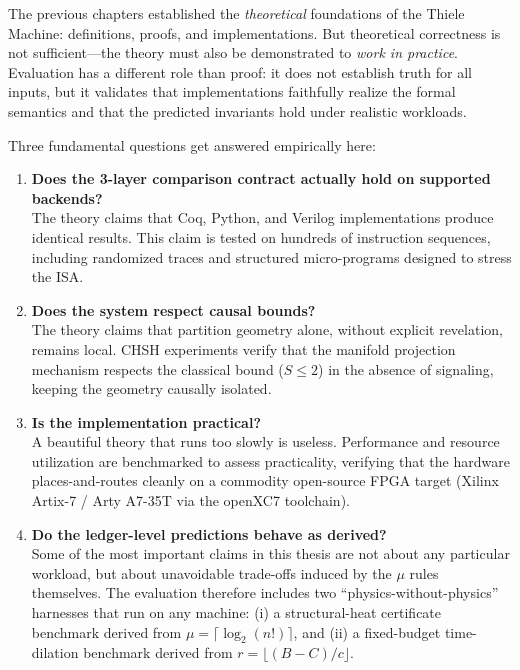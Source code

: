 The previous chapters established the \textit{theoretical} foundations of the Thiele Machine: definitions, proofs, and implementations. But theoretical correctness is not sufficient---the theory must also be demonstrated to \textit{work in practice}. Evaluation has a different role than proof: it does not establish truth for all inputs, but it validates that implementations faithfully realize the formal semantics and that the predicted invariants hold under realistic workloads.

Three fundamental questions get answered empirically here:
\begin{enumerate}
    \item \textbf{Does the 3-layer comparison contract actually hold on supported backends?} \\
    The theory claims that Coq, Python, and Verilog implementations produce identical results. This claim is tested on hundreds of instruction sequences, including randomized traces and structured micro-programs designed to stress the ISA.
    
    \item \textbf{Does the system respect causal bounds?} \\
    The theory claims that partition geometry alone, without explicit revelation, remains local. CHSH experiments verify that the manifold projection mechanism respects the classical bound ($S \le 2$) in the absence of signaling, keeping the geometry causally isolated.
    
    \item \textbf{Is the implementation practical?} \\
    A beautiful theory that runs too slowly is useless. Performance and resource utilization are benchmarked to assess practicality, verifying that the hardware places-and-routes cleanly on a commodity open-source FPGA target (Xilinx Artix-7 / Arty A7-35T via the openXC7 toolchain).

    \item \textbf{Do the ledger-level predictions behave as derived?} \\
    Some of the most important claims in this thesis are not about any particular workload, but about unavoidable trade-offs induced by the $\mu$ rules themselves. The evaluation therefore includes two ``physics-without-physics'' harnesses that run on any machine: (i) a structural-heat certificate benchmark derived from $\mu=\lceil\log_2(n!)\rceil$, and (ii) a fixed-budget time-dilation benchmark derived from $r=\lfloor(B-C)/c\rfloor$.
\end{enumerate}

